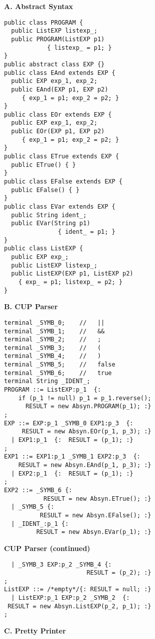 \begin{figure}
\begin{boxedminipage}[t]{\textwidth}
\begin{minipage}[l]{0.5\textwidth}
\normalsize
\textbf{A. Abstract Syntax}
\scriptsize
\begin{verbatim}
public class PROGRAM {
  public ListEXP listexp_;
  public PROGRAM(ListEXP p1) 
            { listexp_ = p1; }
}
public abstract class EXP {}
public class EAnd extends EXP {
  public EXP exp_1, exp_2;
  public EAnd(EXP p1, EXP p2) 
     { exp_1 = p1; exp_2 = p2; }
}
public class EOr extends EXP {
  public EXP exp_1, exp_2;
  public EOr(EXP p1, EXP p2) 
     { exp_1 = p1; exp_2 = p2; }
}
public class ETrue extends EXP {
  public ETrue() { }
}
public class EFalse extends EXP {
  public EFalse() { }
}
public class EVar extends EXP {
  public String ident_;
  public EVar(String p1) 
               { ident_ = p1; }
}
public class ListEXP {
  public EXP exp_;
  public ListEXP listexp_; 
  public ListEXP(EXP p1, ListEXP p2)
    { exp_ = p1; listexp_ = p2; }
}
\end{verbatim}
\normalsize
\textbf{B. CUP Parser}
\scriptsize
\begin{verbatim}
terminal _SYMB_0;    //   ||
terminal _SYMB_1;    //   &&
terminal _SYMB_2;    //   ;
terminal _SYMB_3;    //   (
terminal _SYMB_4;    //   )
terminal _SYMB_5;    //   false
terminal _SYMB_6;    //   true
terminal String _IDENT_;
PROGRAM ::= ListEXP:p_1  {: 
    if (p_1 != null) p_1 = p_1.reverse();
      RESULT = new Absyn.PROGRAM(p_1); :} 
;
EXP ::= EXP:p_1 _SYMB_0 EXP1:p_3  {: 
     RESULT = new Absyn.EOr(p_1, p_3); :} 
  | EXP1:p_1  {:  RESULT = (p_1); :}
;
EXP1 ::= EXP1:p_1 _SYMB_1 EXP2:p_3  {:
    RESULT = new Absyn.EAnd(p_1, p_3); :} 
  | EXP2:p_1  {:  RESULT = (p_1); :}
;
EXP2 ::= _SYMB_6 {:
           RESULT = new Absyn.ETrue(); :} 
  | _SYMB_5 {:
          RESULT = new Absyn.EFalse(); :}
  | _IDENT_:p_1 {: 
         RESULT = new Absyn.EVar(p_1); :}
\end{verbatim}
\normalsize
\end{minipage}
\hfill
\begin{minipage}[r]{0.5\textwidth}
\normalsize
\textbf{CUP Parser (continued)}
\scriptsize
\begin{verbatim}
  | _SYMB_3 EXP:p_2 _SYMB_4 {:
                       RESULT = (p_2); :}
;
ListEXP ::= /*empty*/{: RESULT = null; :}
  | ListEXP:p_1 EXP:p_2 _SYMB_2  {:
 RESULT = new Absyn.ListEXP(p_2, p_1); :}
;
\end{verbatim}
\normalsize
\textbf{C. Pretty Printer}

\end{minipage}
\end{boxedminipage}
\end{figure}
